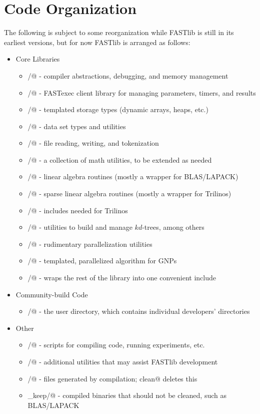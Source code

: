 \documentclass[letter]{report}
\begin{document}
\section {Code Organization}
The following is subject to some reorganization while FASTlib is still
in its earliest versions, but for now FASTlib is arranged as follows:
\begin{itemize}
\item Core Libraries
  \begin{itemize}
  \item \verb@base/@ - compiler abstractions, debugging, and memory management
  \item \verb@fx/@ - FASTexec client library for managing parameters, timers, and results
  \item \verb@col/@ - templated storage types (dynamic arrays, heaps, etc.)
  \item \verb@data/@ - data set types and utilities
  \item \verb@file/@ - file reading, writing, and tokenization
  \item \verb@math/@ - a collection of math utilities, to be extended as needed
  \item \verb@la/@ - linear algebra routines (mostly a wrapper for BLAS/LAPACK)
  \item \verb@sparse/@ - sparse linear algebra routines (mostly a wrapper for Trilinos)
  \item \verb@trilinos/@ - includes needed for Trilinos
  \item \verb@tree/@ - utilities to build and manage $kd$-trees, among others
  \item \verb@par/@ - rudimentary parallelization utilities
  \item \verb@thor/@ - templated, parallelized algorithm for GNPs
  \item \verb@fastlib/@ - wraps the rest of the library into one convenient include
  \end{itemize}
\item Community-build Code
  \begin {itemize}
  \item \verb@u/@ - the user directory, which contains individual developers' directories
\end {itemize} 
\item  Other
  \begin {itemize}
  \item \verb@script/@ - scripts for compiling code, running experiments, etc.
  \item \verb@util/@ - additional utilities that may assist FASTlib development
  \item \verb@bin/@ - files generated by compilation; \verb@make clean@ deletes this
  \item \verb@bin_keep/@ - compiled binaries that should not be cleaned, such as BLAS/LAPACK
  \end {itemize}
\end{itemize}
\end{document}
